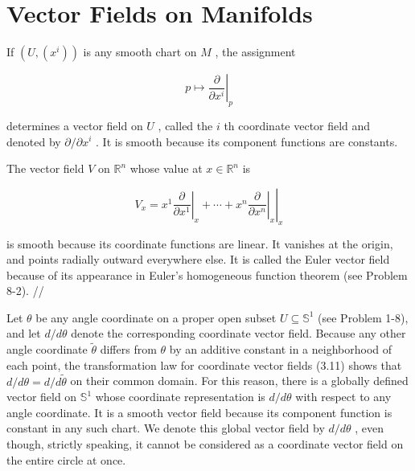 

\section{Vector Fields on Manifolds}

\begin{example}
\label{ex:8-2}
\leanok
{}
If $\left( {U,\left( {x}^{i}\right) }\right)$ is any smooth chart on $M$ , the assignment

\[
p \mapsto  {\left. \frac{\partial }{\partial {x}^{i}}\right| }_{p}
\]

determines a vector field on $U$ , called the $i$ th coordinate vector field and denoted by $\partial /\partial {x}^{i}$ . It is smooth because its component functions are constants.
\end{example}

\begin{example}
\label{ex:8-3}
\leanok
{}
The vector field $V$ on ${\mathbb{R}}^{n}$ whose value at $x \in  {\mathbb{R}}^{n}$ is

\[
{V}_{x} = {\left. {x}^{1}{\left. \frac{\partial }{\partial {x}^{1}}\right| }_{x} + \cdots  + {x}^{n}{\left. \frac{\partial }{\partial {x}^{n}}\right| }_{x}\right| }_{x}
\]

is smooth because its coordinate functions are linear. It vanishes at the origin, and points radially outward everywhere else. It is called the Euler vector field because of its appearance in Euler's homogeneous function theorem (see Problem 8-2). //
\end{example}

\begin{example}
\label{ex:8-4}
\leanok
{}
Let $\theta$ be any angle coordinate on a proper open subset $U \subseteq  {\mathbb{S}}^{1}$ (see Problem 1-8), and let $d/{d\theta }$ denote the corresponding coordinate vector field. Because any other angle coordinate $\widetilde{\theta }$ differs from $\theta$ by an additive constant in a neighborhood of each point, the transformation law for coordinate vector fields (3.11) shows that $d/{d\theta } = d/d\widetilde{\theta }$ on their common domain. For this reason, there is a globally defined vector field on ${\mathbb{S}}^{1}$ whose coordinate representation is $d/{d\theta }$ with respect to any angle coordinate. It is a smooth vector field because its component function is constant in any such chart. We denote this global vector field by $d/{d\theta }$ , even though, strictly speaking, it cannot be considered as a coordinate vector field on the entire circle at once.
\end{example}

